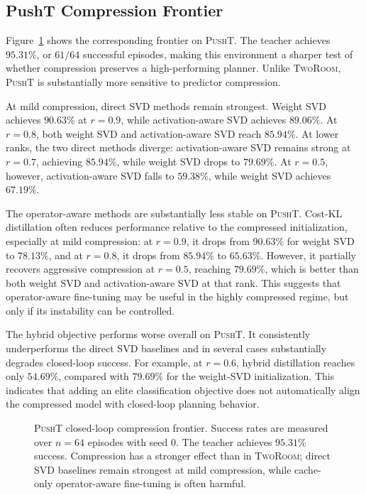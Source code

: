 \documentclass[11pt]{article}
\begin{document}
\subsection{PushT Compression Frontier}
\label{sec:pusht_frontier}

Figure~\ref{fig:pusht-frontier} shows the corresponding frontier on \textsc{PushT}. The teacher achieves \(95.31\%\), or \(61/64\) successful episodes, making this environment a sharper test of whether compression preserves a high-performing planner. Unlike \textsc{TwoRoom}, \textsc{PushT} is substantially more sensitive to predictor compression.

At mild compression, direct SVD methods remain strongest. Weight SVD achieves \(90.63\%\) at \(r=0.9\), while activation-aware SVD achieves \(89.06\%\). At \(r=0.8\), both weight SVD and activation-aware SVD reach \(85.94\%\). At lower ranks, the two direct methods diverge: activation-aware SVD remains strong at \(r=0.7\), achieving \(85.94\%\), while weight SVD drops to \(79.69\%\). At \(r=0.5\), however, activation-aware SVD falls to \(59.38\%\), while weight SVD achieves \(67.19\%\).

The operator-aware methods are substantially less stable on \textsc{PushT}. Cost-KL distillation often reduces performance relative to the compressed initialization, especially at mild compression: at \(r=0.9\), it drops from \(90.63\%\) for weight SVD to \(78.13\%\), and at \(r=0.8\), it drops from \(85.94\%\) to \(65.63\%\). However, it partially recovers aggressive compression at \(r=0.5\), reaching \(79.69\%\), which is better than both weight SVD and activation-aware SVD at that rank. This suggests that operator-aware fine-tuning may be useful in the highly compressed regime, but only if its instability can be controlled.

The hybrid objective performs worse overall on \textsc{PushT}. It consistently underperforms the direct SVD baselines and in several cases substantially degrades closed-loop success. For example, at \(r=0.6\), hybrid distillation reaches only \(54.69\%\), compared with \(79.69\%\) for the weight-SVD initialization. This indicates that adding an elite classification objective does not automatically align the compressed model with closed-loop planning behavior.

\begin{figure}[t]
    \centering
    \caption{
    \textsc{PushT} closed-loop compression frontier.
    Success rates are measured over \(n=64\) episodes with seed \(0\).
    The teacher achieves \(95.31\%\) success. Compression has a stronger effect than in \textsc{TwoRoom}; direct SVD baselines remain strongest at mild compression, while cache-only operator-aware fine-tuning is often harmful.
    }
    \label{fig:pusht-frontier}
\end{figure}
\end{document}
